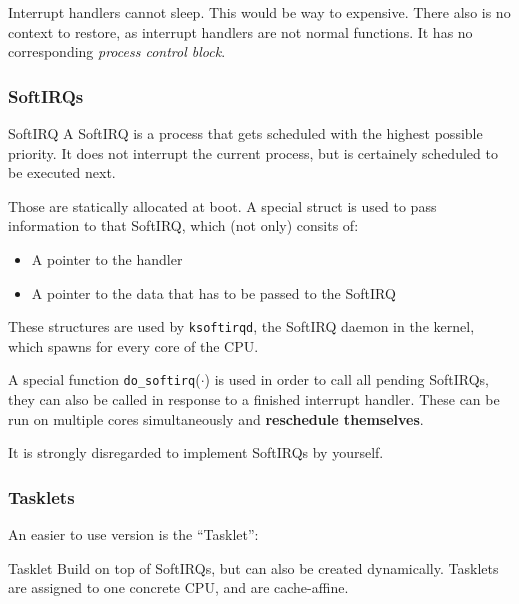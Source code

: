 \documentclass[english]{panikzettel}
\newcommand{\fkt}[1]{\texttt{#1}(\(\cdot\))}
\begin{document}
	\begin{alertbox}
		Interrupt handlers cannot sleep. 
		This would be way to expensive.
		There also is no context to restore, as interrupt handlers are not normal functions. 
		It has no corresponding \textit{process control block}.
	\end{alertbox}
	
	\subsubsection{SoftIRQs}
	\label{sss-softirqs}
	
	\begin{defi}{SoftIRQ}
		A SoftIRQ is a process that gets scheduled with the highest possible priority. It does not interrupt the current process, but is certainely scheduled to be executed next.
	\end{defi}

	Those are statically allocated at boot. 
	A special struct is used to pass information to that SoftIRQ, which (not only) consits of:
	\begin{itemize}
		\item A pointer to the handler
		\item A pointer to the data that has to be passed to the SoftIRQ
	\end{itemize}

	These structures are used by \texttt{ksoftirqd}, the SoftIRQ daemon in the kernel, which spawns for every core of the CPU.

	A special function \fkt{do\_softirq} is used in order to call all pending SoftIRQs, they can also be called in response to a finished interrupt handler.
	These can be run on multiple cores simultaneously and \textbf{reschedule themselves}.

	It is strongly disregarded to implement SoftIRQs by yourself.

	\subsubsection{Tasklets}
	\label{sss-tasklets}
	
	An easier to use version is the \enquote{Tasklet}:

	\begin{defi}{Tasklet}
		Build on top of SoftIRQs, but can also be created dynamically.
		Tasklets are assigned to one concrete CPU, and are cache-affine.
	\end{defi}
\end{document}
